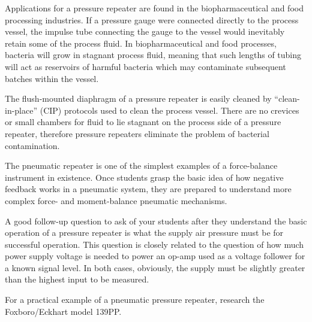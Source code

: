 \vskip 10pt

Applications for a pressure repeater are found in the biopharmaceutical and food processing industries.  If a pressure gauge were connected directly to the process vessel, the impulse tube connecting the gauge to the vessel would inevitably retain some of the process fluid.  In biopharmaceutical and food processes, bacteria will grow in stagnant process fluid, meaning that such lengths of tubing will act as reservoirs of harmful bacteria which may contaminate subsequent batches within the vessel.

The flush-mounted diaphragm of a pressure repeater is easily cleaned by ``clean-in-place'' (CIP) protocols used to clean the process vessel.  There are no crevices or small chambers for fluid to lie stagnant on the process side of a pressure repeater, therefore pressure repeaters eliminate the problem of bacterial contamination.







The pneumatic repeater is one of the simplest examples of a force-balance instrument in existence.  Once students grasp the basic idea of how negative feedback works in a pneumatic system, they are prepared to understand more complex force- and moment-balance pneumatic mechanisms.

A good follow-up question to ask of your students after they understand the basic operation of a pressure repeater is what the supply air pressure must be for successful operation.  This question is closely related to the question of how much power supply voltage is needed to power an op-amp used as a voltage follower for a known signal level.  In both cases, obviously, the supply must be slightly greater than the highest input to be measured.

\vskip 10pt

For a practical example of a pneumatic pressure repeater, research the Foxboro/Eckhart model 139PP.




